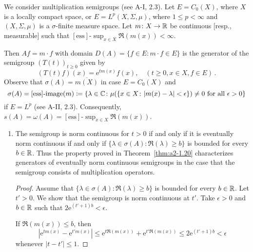 \begin{example}\label{ex:a2-1.28}
We consider multiplication semigroups (see A-I, 2.3).
Let $E = C_{0}(X)$, where $X$ is a locally compact space, or $E = L^{p}(X,\Sigma,\mu)$, where $1 \leq p < \infty$ and $(X,\Sigma,\mu)$ is a $\sigma$-finite measure space.
Let $m \colon X \to \mathbb{R}$ be continuous [resp., measurable] such that $[\text{ess}]\text{-}\sup_{x \in X} \Re(m(x)) < \infty$.

Then $Af = m \cdot f$ with domain $D(A) = \{f \in E \colon m \cdot f \in E\}$ is the generator of the semigroup $(T(t))_{t \geq 0}$ given by
\[
    (T(t)f)(x) = \mathrm{e}^{tm(x)}f(x), \quad (t \geq 0, x \in X, f \in E )\, .
\]
Observe that $\sigma(A) = \overline{m(X)}$ in case $E = C_{0}(X)$ 
and 
\[
\sigma(A) = [\text{ess}]\text{-}\text{image}(m) \coloneqq \{\lambda \in \mathbb{C} \colon \mu(\{x \in X \colon |m(x)-\lambda| < \epsilon\}) \neq 0 \text{ for all } \epsilon > 0\}
\]
if $E = L^{p}$ (see A-II, 2.3).
Consequently, $s(A) = \omega(A) = [\text{ess}]\text{-}\sup_{x \in X} \Re(m(x))$.

\begin{enumerate}[\upshape (i), wide, labelindent=.5em]
\item \label{ex:a2-1.28-1}
The semigroup is norm continuous for $t > 0$ if and only if it is eventually norm continuous if and only if 
$\{\lambda \in \sigma(A) \colon \Re(\lambda) \geq b\}$ 
is bounded for every $b \in \mathbb{R}$.
Thus the property proved in Theorem~\ref{thm:a2-1.20}   characterizes generators of eventually norm continuous semigroups in the case that the semigroup consists of multiplication operators.
\begin{proof}
Assume that $\{\lambda \in \sigma(A) \colon \Re(\lambda) \geq b\}$ is bounded for every $b \in \mathbb{R}$.
Let $t' > 0$.
We show that the semigroup is norm continuous at $t'$.
Take $\epsilon > 0$ and $b \in \mathbb{R}$ such that $2\mathrm{e}^{(t'+1)b} < \epsilon$.

If $\Re(m(x)) \leq b$, then
\[
    |\mathrm{e}^{tm(x)} - \mathrm{e}^{t'm(x)}| \leq \mathrm{e}^{t\Re(m(x))} + \mathrm{e}^{t'\Re(m(x))} \leq 2\mathrm{e}^{(t'+1)b} < \epsilon
\]
whenever $|t-t'| \leq 1$.


\end{proof}
\end{enumerate}
\end{example}
